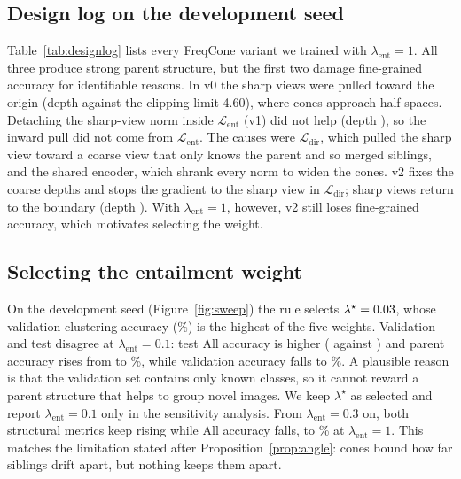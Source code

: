 \documentclass[10pt]{article}
\newcommand{\Lb}{\mathcal{L}}
\begin{document}
\subsection{Design log on the development seed}
Table~\ref{tab:designlog} lists every FreqCone variant we trained with $\lambda_{\mathrm{ent}}=1$. All three
produce strong parent structure, but the first two damage fine-grained accuracy for identifiable reasons.
In v0 the sharp views were pulled toward the origin (depth \logDepthVzero{} against the clipping limit
4.60), where cones approach half-spaces. Detaching the sharp-view norm inside $\Lb_{\mathrm{ent}}$ (v1) did not
help (depth \logDepthVone), so the inward pull did not come from $\Lb_{\mathrm{ent}}$. The causes were
$\Lb_{\mathrm{dir}}$, which pulled the sharp view toward a coarse view that only knows the parent and so merged
siblings, and the shared encoder, which shrank every norm to widen the cones. v2 fixes the coarse depths and
stops the gradient to the sharp view in $\Lb_{\mathrm{dir}}$; sharp views return to the boundary
(depth \logDepthVtwo). With $\lambda_{\mathrm{ent}}=1$, however, v2 still loses fine-grained accuracy, which
motivates selecting the weight.

\begin{table}[t]
\centering\small
{}
\caption{Development seed 0, $\lambda_{\mathrm{ent}}=1$. Depth is the mean $\delta_c(u)$ of sharp views; the
clipping radius limits it to 4.60. For reference, spherical GCD reaches 80.0 / 73.6 / 83.2 with 22.8\% parent
accuracy and 23.5\% novel-to-parent attribution.}\label{tab:designlog}
\end{table}

\subsection{Selecting the entailment weight}
On the development seed (Figure~\ref{fig:sweep}) the rule selects $\lambda^\star=0.03$, whose validation
clustering accuracy (\devValcb\%) is the highest of the five weights. Validation and test disagree at
$\lambda_{\mathrm{ent}}=0.1$: test All accuracy is higher (\devAllc{} against \devAllb) and parent accuracy rises
from \devParb{} to \devParc\%, while validation accuracy falls to \devValcc\%. A plausible reason is that the
validation set contains only known classes, so it cannot reward a parent structure that helps to group novel
images. We keep $\lambda^\star$ as selected and report $\lambda_{\mathrm{ent}}=0.1$ only in the sensitivity
analysis. From $\lambda_{\mathrm{ent}}=0.3$ on, both structural metrics keep rising while All accuracy falls, to
\devAlle\% at $\lambda_{\mathrm{ent}}=1$. This matches the limitation stated after
Proposition~\ref{prop:angle}: cones bound how far siblings drift apart, but nothing keeps them apart.
\end{document}
